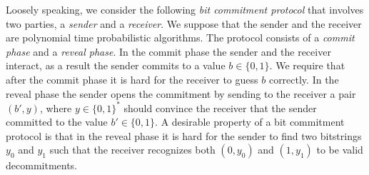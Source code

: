 Loosely speaking, we consider the following \textit{bit commitment protocol} that involves two parties, a \textit{sender} and a \textit{receiver}.
We suppose that the sender and the receiver are polynomial time probabilistic algorithms.
The protocol consists of a \textit{commit phase} and a \textit{reveal phase}.
In the commit phase the sender and the receiver interact, as a result the sender commits to a value $b \in \{0,1\}$.
We require that after the commit phase it is hard for the receiver to guess $b$ correctly.
In the reveal phase the sender opens the commitment by sending to the receiver a pair $(b', y)$, where $y \in \{0,1\}^{*}$
should convince the receiver that the sender committed to the value $b' \in \{0,1\}$.
A desirable property of a bit commitment protocol is that in the reveal phase it is hard for
the sender to find two bitstrings $y_0$ and $y_1$ such that the receiver recognizes both $(0,y_0)$ and $(1, y_1)$ to be valid decommitments.

